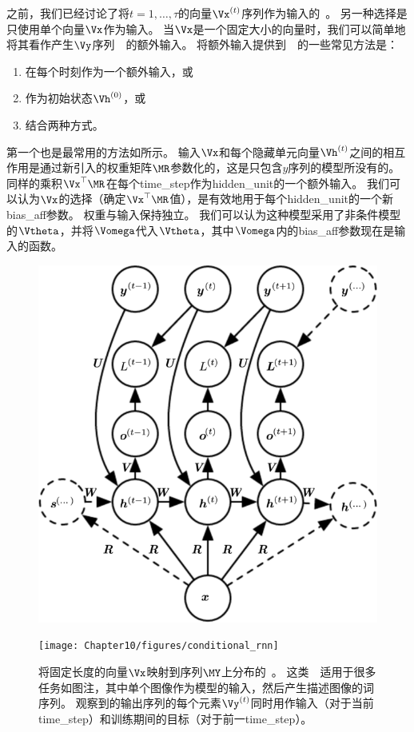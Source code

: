 
之前，我们已经讨论了将$t =1, \dots, \tau$的向量$\Vx^{(t)}$序列作为输入的~。
另一种选择是只使用单个向量$\Vx$作为输入。
当$\Vx$是一个固定大小的向量时，我们可以简单地将其看作产生$\Vy$序列~~的额外输入。
将额外输入提供到~~的一些常见方法是：
\begin{enumerate}
 \item 在每个时刻作为一个额外输入，或
 \item 作为初始状态$\Vh^{(0)}$，或
 \item 结合两种方式。
\end{enumerate}

第一个也是最常用的方法如所示。
输入$\Vx$和每个隐藏单元向量$\Vh^{(t)}$之间的相互作用是通过新引入的权重矩阵$\MR$参数化的，这是只包含$y$序列的模型所没有的。
同样的乘积$\Vx^\top\MR$在每个\gls{time_step}作为\gls{hidden_unit}的一个额外输入。
我们可以认为$\Vx$的选择（确定$\Vx^\top\MR$值），是有效地用于每个\gls{hidden_unit}的一个新\gls{bias_aff}参数。
权重与输入保持独立。
我们可以认为这种模型采用了非条件模型的$\Vtheta$，并将$\Vomega$代入$\Vtheta$，其中$\Vomega$内的\gls{bias_aff}参数现在是输入的函数。

\begin{figure}[!htb]
\ifOpenSource
\centerline{\includegraphics[scale=0.5]{images/97.png}}
\else
\centerline{\texttt{[image: Chapter10/figures/conditional\_rnn]}}
\fi
\caption{将固定长度的向量$\Vx$映射到序列$\MY$上分布的~。
这类~~适用于很多任务如图注，其中单个图像作为模型的输入，然后产生描述图像的词序列。
观察到的输出序列的每个元素$\Vy^{(t)}$同时用作输入（对于当前\gls{time_step}）和训练期间的目标（对于前一\gls{time_step}）。
}
\label{fig:chap10_conditional_rnn}
\end{figure}

